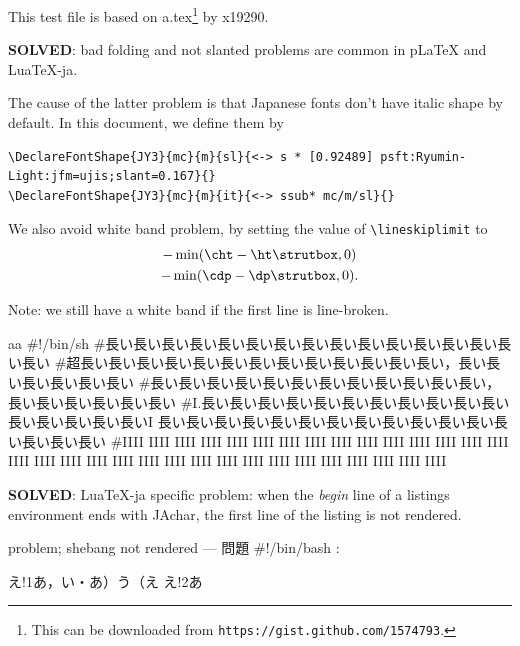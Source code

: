 \documentclass{ltjarticle}
\def\cs#1{\hbox{\texttt{\textbackslash #1}}}
\begin{document}
This test file is based on a.tex\footnote{This can be downloaded from {\tt https://gist.github.com/1574793}.} by x19290.


\textbf{SOLVED}: bad folding and not slanted problems are common in pLaTeX and LuaTeX-ja.

The cause of the latter problem is that Japanese fonts don't have italic shape by default.
In this document, we define them by
\begin{lstlisting}[language={[AlLaTeX]TeX}, basicstyle=\ttfamily]
\DeclareFontShape{JY3}{mc}{m}{sl}{<-> s * [0.92489] psft:Ryumin-Light:jfm=ujis;slant=0.167}{}
\DeclareFontShape{JY3}{mc}{m}{it}{<-> ssub* mc/m/sl}{}
\end{lstlisting}

\newpage

We also avoid white band problem, by setting the value of \cs{lineskiplimit} to
\begin{multline}
 -\min(\cs{cht}-\cs{ht}\cs{strutbox}, 0)\\
 -\min(\cs{cdp}-\cs{dp}\cs{strutbox}, 0).
\end{multline}

Note: we still have a white band if the first line is line-broken.

\begin{env}{\relax}aa
#!/bin/sh
#長い長い長い長い長い長い長い長い長い長い長い長い長い長い長い長い
#超長い長い長い長い長い長い長い長い長い長い長い長い長い，長い長い長い長い長い長い
#長い長い長い長い長い長い長い長い長い長い長い長い，長い長い長い長い長い長い
#I.長い長い長い長い長い長い長い長い長い長い長い長い長い長い長い長いI
長い長い長い長い長い長い長い長い長い長い長い長い長い長い長い長い
#IIII IIII IIII IIII IIII IIII IIII IIII IIII IIII IIII IIII IIII IIII IIII IIII
IIII IIII IIII IIII IIII IIII IIII IIII IIII IIII IIII IIII IIII IIII IIII IIII
\end{env}

\newpage

\textbf{SOLVED}: LuaTeX-ja specific problem:
when the \emph{begin} line of a listings environment ends with JAchar,
the first line of the listing is not rendered.

\begin{env}{problem; shebang not rendered --- 問題}
#!/bin/bash
:
\end{env}

\loggingall
\begin{LTXexample}[language=TeX]
え!1あ，い・あ）う（え
え!2あ
\end{LTXexample}
\end{document}
